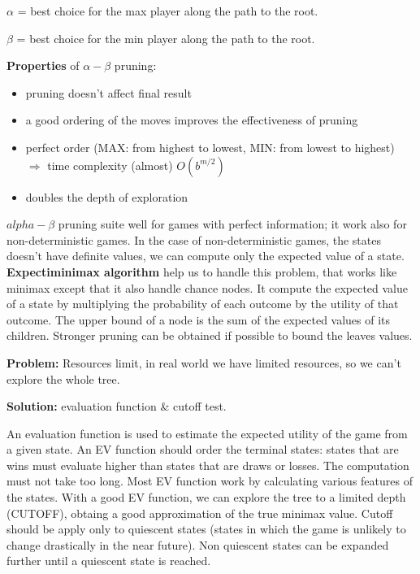 \documentclass[12pt]{article}
\begin{document}
\begin{enumerate}[label=\textbf{AS.\arabic*}]
    $\alpha$ = best choice for the max player along the path to the root.

    $\beta$ = best choice for the min player along the path to the root.

    \textbf{Properties} of $\alpha - \beta$ pruning:
    \begin{itemize}
        \item pruning doesn't affect final result
        \item a good ordering of the moves improves the effectiveness of pruning
        \item perfect order (MAX\@: from highest to lowest, MIN\@: from lowest to highest) $\Rightarrow$ time complexity (almost) $O(b^{m/2})$
        \item doubles the depth of exploration
    \end{itemize}

    $alpha - \beta$ pruning suite well for games with perfect information; it work also for non-deterministic games.
    In the case of non-deterministic games, the states doesn't have definite values, we can compute only the expected value of a state.
    \textbf{Expectiminimax algorithm} help us to handle this problem, that works like minimax 
    except that it also handle chance nodes.
    It compute the expected value of a state by multiplying the probability of each outcome by the utility of that outcome.
    The upper bound of a node is the sum of the expected values of its children.
    Stronger pruning can be obtained if possible to bound the leaves values.

    \textbf{Problem:} Resources limit, in real world we have limited resources, so we can't explore the whole tree.
    
    \textbf{Solution:} evaluation function \& cutoff test.

    An evaluation function is used to estimate the expected utility of the game from a given state.
        An EV function should order the terminal states: 
        states that are wins must evaluate higher than states that are draws or losses.
        The computation must not take too long.
        Most EV function work by calculating various features of the states.
        With a good EV function, we can explore the tree to a limited depth (CUTOFF), obtaing a good approximation of the true minimax value.
        Cutoff should be apply only to quiescent states (states in which the game is unlikely to change drastically in the near future).
        Non quiescent states can be expanded further until a quiescent state is reached.
    

\end{enumerate}
\end{document}
